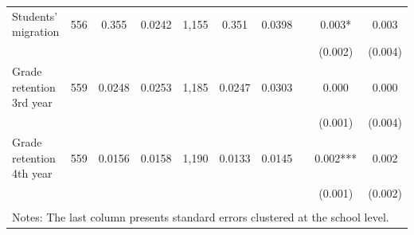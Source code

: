 \documentclass[12pt]{article}
\theoremstyle{plain}
\theoremstyle{plain}
\theoremstyle{plain}
\theoremstyle{definition}
\theoremstyle{plain}
\theoremstyle{definition}
\theoremstyle{plain}
\theoremstyle{remark}
\theoremstyle{definition}
\theoremstyle{definition}
\theoremstyle{plain}
\begin{document}
\begin{table}[H]
{\begin{tabular}{p{10.11em}lllllllll}
    \multicolumn{1}{l}{Students' migration} & \multicolumn{1}{c}{556} & \multicolumn{1}{c}{0.355} & \multicolumn{1}{c}{0.0242} & \multicolumn{1}{c}{1,155} & \multicolumn{1}{c}{0.351} & \multicolumn{1}{c}{0.0398} & \multicolumn{1}{c|}{} & \multicolumn{1}{c}{0.003*} & \multicolumn{1}{c}{0.003} \\
    \multicolumn{1}{r}{} &       &       &       &       &       &       & \multicolumn{1}{c|}{} & \multicolumn{1}{c}{(0.002)} & \multicolumn{1}{c}{(0.004)} \\
    \multicolumn{1}{l}{Grade retention 3rd year} & \multicolumn{1}{c}{559} & \multicolumn{1}{c}{0.0248} & \multicolumn{1}{c}{0.0253} & \multicolumn{1}{c}{1,185} & \multicolumn{1}{c}{0.0247} & \multicolumn{1}{c}{0.0303} & \multicolumn{1}{c|}{} & \multicolumn{1}{c}{0.000} & \multicolumn{1}{c}{0.000} \\
    \multicolumn{1}{r}{} &       &       &       &       &       &       & \multicolumn{1}{c|}{} & \multicolumn{1}{c}{(0.001)} & \multicolumn{1}{c}{(0.004)} \\
    \multicolumn{1}{l}{Grade retention 4th year} & \multicolumn{1}{c}{559} & \multicolumn{1}{c}{0.0156} & \multicolumn{1}{c}{0.0158} & \multicolumn{1}{c}{1,190} & \multicolumn{1}{c}{0.0133} & \multicolumn{1}{c}{0.0145} & \multicolumn{1}{c|}{} & \multicolumn{1}{c}{0.002***} & \multicolumn{1}{c}{0.002} \\
    \multicolumn{1}{r}{} &       &       &       &       &       &       & \multicolumn{1}{c|}{} & \multicolumn{1}{c}{(0.001)} & \multicolumn{1}{c}{(0.002)} \\
    \multicolumn{1}{r}{} &       &       &       &       &       &       &       &       &  \\
    \midrule
    \multicolumn{10}{p{53.61em}}{Notes: The last column presents standard errors clustered at the school level.} \\
    \end{tabular}%
}
\end{table}

\FloatBarrier
\end{document}
